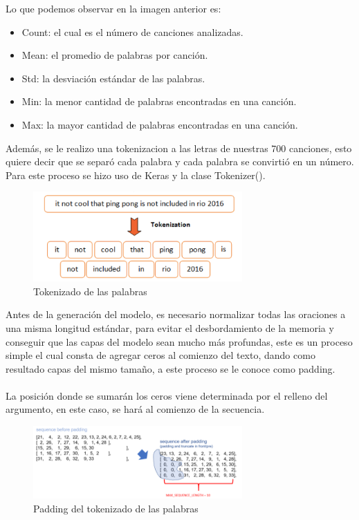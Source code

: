 Lo que podemos observar en la imagen anterior es:
\begin{itemize}
	\item Count: el cual es el número de canciones analizadas.
	\item Mean: el promedio de palabras por canción.
	\item Std: la desviación estándar de las palabras.
	\item Min: la menor cantidad de palabras encontradas en una canción.
	\item Max: la mayor cantidad de palabras encontradas en una canción.
\end{itemize}
Además, se le realizo una tokenizacion a las letras de nuestras 700 canciones, esto quiere decir que se separó cada palabra y cada palabra se convirtió en un número. Para este proceso se hizo uso de Keras y la clase Tokenizer().
\begin{figure}[h]
	\centering
	\includegraphics[width=8cm]{figuras/tokenization.png}
	\caption{Tokenizado de las palabras \cite{tokenimagen}}
	\label{fig:Tokenizado de las palabras}
\end{figure}
Antes de la generación del modelo, es necesario normalizar todas las oraciones a una misma longitud estándar, para evitar el desbordamiento de la memoria y conseguir que las capas del modelo sean mucho más profundas, este es un proceso simple el cual consta de agregar ceros al comienzo del texto, dando como resultado capas del mismo tamaño, a este proceso se le conoce como padding.\\\\
La posición donde se sumarán los ceros viene determinada por el relleno del argumento, en este caso, se hará al comienzo de la secuencia.
\begin{figure}[h]
	\centering
	\includegraphics[width=8cm]{figuras/padding.png}
	\caption{Padding del tokenizado de las palabras}
	\label{fig:Padding del tokenizado de las palabras}
\end{figure}

